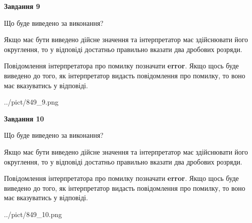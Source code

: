 \documentclass[12pt, ukrainian]{article}
\begin{document}
{\begin {Large}
{\begin {center}\textbf{Завдання 9}\end {center}}\par
Що буде виведено за виконання? \par

Якщо має бути виведено дійсне значення та інтерпретатор має здійснювати його округлення, 
то у відповіді достатньо правильно вказати два дробових розряди.

Повідомлення інтерпретатора про помилку позначати \textbf{error}.
Якщо щось буде виведено до того, як інтерпретатор видасть повідомлення про помилку, 
то воно має вказуватись у відповіді. \par

\begin{center}
	{../pict/849_9.png}
\end{center}
\newpage

{\begin {center}\textbf{Завдання 10}\end {center}}\par
Що буде виведено за виконання? \par

Якщо має бути виведено дійсне значення та інтерпретатор має здійснювати його округлення, 
то у відповіді достатньо правильно вказати два дробових розряди.

Повідомлення інтерпретатора про помилку позначати \textbf{error}.
Якщо щось буде виведено до того, як інтерпретатор видасть повідомлення про помилку, 
то воно має вказуватись у відповіді. \par

\begin{center}
	{../pict/849_10.png}
\end{center}
\newpage

\end {Large}}
\end{document}
